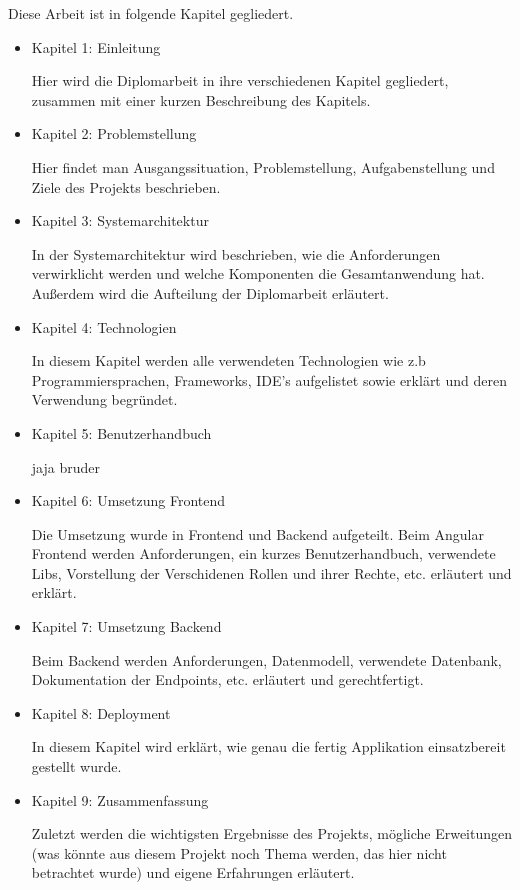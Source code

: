 Diese Arbeit ist in folgende Kapitel gegliedert.

\begin{itemize}
    \item  Kapitel 1: Einleitung
    
    Hier wird die Diplomarbeit in ihre verschiedenen Kapitel gegliedert, zusammen mit einer kurzen Beschreibung des Kapitels.
    
    \item  Kapitel 2: Problemstellung
    
    Hier findet man Ausgangssituation, Problemstellung, Aufgabenstellung und Ziele des Projekts beschrieben.
    
    \item  Kapitel 3: Systemarchitektur
    
    In der Systemarchitektur wird beschrieben, wie die Anforderungen verwirklicht werden und welche Komponenten die Gesamtanwendung hat. 
    Außerdem wird die Aufteilung der Diplomarbeit erläutert.

    \item  Kapitel 4: Technologien
    
    In diesem Kapitel werden alle verwendeten Technologien wie z.b Programmiersprachen, Frameworks, IDE's aufgelistet sowie erklärt und deren Verwendung begründet.
    
    \item  Kapitel 5: Benutzerhandbuch
    
    jaja bruder

    \item  Kapitel 6: Umsetzung Frontend
    
    Die Umsetzung wurde in Frontend und Backend aufgeteilt. Beim Angular Frontend werden Anforderungen, ein kurzes Benutzerhandbuch, verwendete Libs, Vorstellung der Verschidenen Rollen und ihrer Rechte, etc. erläutert und erklärt.
    
    \item  Kapitel 7: Umsetzung Backend
    
    Beim Backend werden Anforderungen, Datenmodell, verwendete Datenbank, Dokumentation der Endpoints, etc. erläutert und gerechtfertigt.

    \item  Kapitel 8: Deployment
    
    In diesem Kapitel wird erklärt, wie genau die fertig Applikation einsatzbereit gestellt wurde.
    
    \item  Kapitel 9: Zusammenfassung
    
    Zuletzt werden die wichtigsten Ergebnisse des Projekts, mögliche Erweitungen (was könnte aus diesem Projekt noch Thema werden, 
    das hier nicht betrachtet wurde) und eigene Erfahrungen erläutert.
\end{itemize}